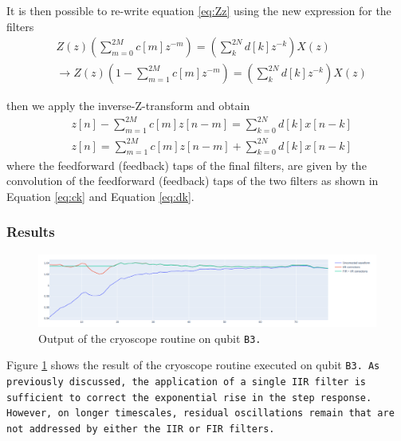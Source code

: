 It is then possible to re-write equation \ref{eq:Zz} using the new expression for the filters
\begin{align}
    & Z(z)\left( \sum_{m=0}^{2M} c[m]z^{-m} \right) = \left( \sum_{k}^{2N} d[k]z^{-k} \right)X(z)\\
    & \rightarrow Z(z)\left(1 - \sum_{m=1}^{2M} c[m]z^{-m} \right) = \left( \sum_{k}^{2N} d[k]z^{-k} \right)X(z) \label{eq:z_final}
\end{align} 

then we apply the inverse-Z-transform and obtain
\begin{align}
    & z[n] - \sum_{m=1}^{2M} c[m]z[n-m] = \sum_{k=0}^{2N} d[k] x[n-k]\\
    & z[n] = \sum_{m=1}^{2M} c[m]z[n-m] + \sum_{k=0}^{2N} d[k] x[n-k]
\end{align}
where the feedforward (feedback) taps of the final filters, are given by the convolution of the feedforward (feedback) taps of the two filters as shown in Equation \ref{eq:ck} and Equation \ref{eq:dk}.

\subsubsection{Results}\label{subsec:cryo_results}

\begin{figure}[h!]
    \centering
    \includegraphics[width=\textwidth]{figures/png/Cryoscope/B3.png}
    \caption{Output of the cryoscope routine on qubit \tt{B3}.}
    \label{fig:cryoscope:B3}
\end{figure} 

Figure \ref{fig:cryoscope:B3} shows the result of the cryoscope routine executed on qubit \tt{B3}. 
As previously discussed, the application of a single IIR filter is sufficient to correct the exponential rise in the step response. 
However, on longer timescales, residual oscillations remain that are not addressed by either the IIR or FIR filters.

